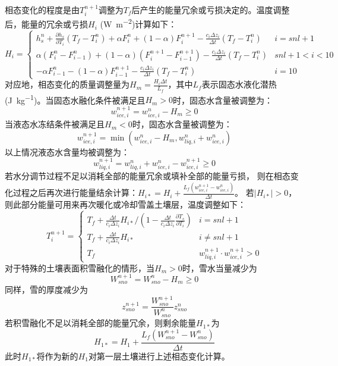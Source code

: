相态变化的程度是由$T_i^{n+1}$调整为$T_f$后产生的能量冗余或亏损决定的。温度调整后，能量的冗余或亏损$H_i$ (\unit{W.m^{-2}})计算如下：
\begin{equation}
H_{i}=\begin{cases}
h_{s}^{n}+\frac{\partial h_{s}}{\partial T_{i}}\left(T_{f}-T_{i}^{n}\right)+\alpha F_{i}^{n}+(1-\alpha) F_{i}^{n+1}-\frac{c_{i} \Delta z_{i}}{\Delta t}\left(T_{f}-T_{i}^{n}\right) & i=snl+1 \\
\alpha\left(F_{i}^{n}-F_{i-1}^{n}\right)+(1-\alpha)\left(F_{i}^{n+1}-F_{i-1}^{n+1}\right)-\frac{c_{i} \Delta z_{i}}{\Delta t}\left(T_{f}-T_{i}^{n}\right) & snl+1<i<10 \\
-\alpha F_{i-1}^{n}-(1-\alpha) F_{i-1}^{n+1}-\frac{c_{i} \Delta z_{i}}{\Delta t}\left(T_{f}-T_{i}^{n}\right) & i=10
\end{cases}
\end{equation}
对应地，相态变化的质量调整量为$H_{m}=\frac{H_{i} \Delta t}{L_{f}}$，其中$L_f$表示固态水液化潜热(\unit{J.kg^{-1}})。当固态水融化条件被满足且$H_m>0$时，固态水含量被调整为：
\begin{equation}
w_{ice, i}^{n+1}=w_{ice, i}^{n}-H_{m} \geq 0
\end{equation}
当液态水冻结条件被满足且$H_m<0$时，固态水含量被调整为：
\begin{equation}
w_{ice, i}^{n+1}=\min{\left(w_{ice, i}^{n}-H_{m}, w_{liq, i}^{n}+w_{ice, i}^{n}\right)}
\end{equation}
以上情况液态水含量均被调整为：
\begin{equation}
w_{liq, i}^{n+1}=w_{liq, i}^{n}+w_{ice, i}^{n}-w_{ice, i}^{n+1} \geq 0
\end{equation}
若水分调节过程不足以消耗全部的能量冗余或填补全部的能量亏损，
则在相态变化过程之后再次进行能量结余计算：$ H_{i *}=H_{i}+\frac{L_{f}\left(w_{ice, i}^{n+1}-w_{ice, i}^{n}\right)}{\Delta t}$。
若$\left|H_{i\ast}\right|>0$，则此部分能量可用来再次暖化或冷却雪盖土壤层，温度调整如下：
\begin{equation}
T_{i}^{n+1}=\left\{\begin{array}{lr}T_{f}+\frac{\Delta t}{c_{i} \Delta z_{i}} H_{i *} /\left(1-\frac{\Delta t}{c_{i} \Delta z_{i}} \frac{\partial T_{s}}{\partial T_{i}}\right) & i=s n l+1 \\ T_{f}+\frac{\Delta t}{c_{i} \Delta z_{i}} H_{i *} & i \neq s n l+1 \\ T_{f} & w_{liq, i}^{n+1} \cdot w_{ice, i}^{n+1}>0\end{array}\right.
\end{equation}
对于特殊的土壤表面积雪融化的情形，当$H_m>0$时，雪水当量减少为
\begin{equation}
W_{sno}^{n+1}=W_{s no}^{n}-H_{m} \geq 0
\end{equation}
同样，雪的厚度减少为
\begin{equation}
z_{sno}^{n+1}=\frac{W_{sno}^{n+1}}{W_{sno}^{n}} z_{sno}^{n}
\end{equation}
若积雪融化不足以消耗全部的能量冗余，则剩余能量$H_{1\ast}$为
\begin{equation}
H_{1 *}=H_{1}+\frac{L_{f}\left(W_{sno}^{n+1}-W_{sno}^{n}\right)}{\Delta t}
\end{equation}
此时$H_{1\ast}$将作为新的$H_1$对第一层土壤进行上述相态变化计算。


